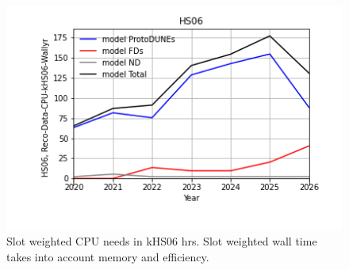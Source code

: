 \begin{figure}[h]
\centering\includegraphics[height=0.4\textwidth]{Parameters_2022-11-21-2026/Parameters_2022-11-21-2026-HS06.png}
\caption{Slot weighted CPU needs in kHS06 hrs. Slot weighted wall time takes into account memory and efficiency.}
\label{fig:HS06}
\end{figure}
